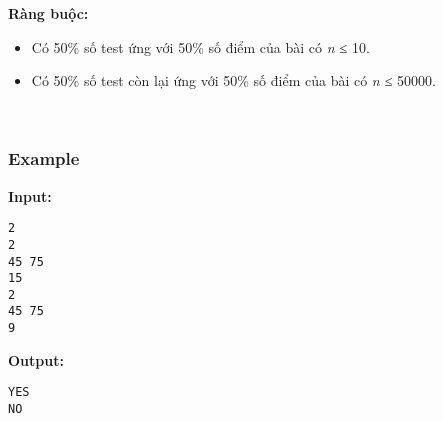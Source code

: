 \textbf{Ràng buộc:}
\begin{itemize}
	\item Có 50\% số test ứng với 50\% số điểm của bài có \emph{ n ≤ } 10.
	\item Có 50\% số test còn lại ứng với 50\% số điểm của bài có \emph{ n ≤ } 50000.
\end{itemize}

 

\subsubsection{Example}

\textbf{Input: }
\begin{verbatim}
2
2
45 75
15
2
45 75
9\end{verbatim}

\textbf{Output: }
\begin{verbatim}
YES
NO\end{verbatim}

